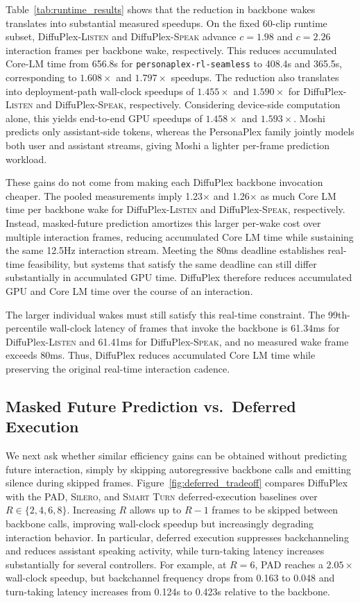 Table~\ref{tab:runtime_results} shows that the reduction in backbone wakes translates into substantial measured speedups.
On the fixed 60-clip runtime subset, DiffuPlex-\textsc{Listen} and DiffuPlex-\textsc{Speak} advance $c=1.98$ and $c=2.26$ interaction frames per backbone wake, respectively.
This reduces accumulated Core-LM time from 656.8s for \texttt{personaplex-rl-seamless} to 408.4s and 365.5s, corresponding to $1.608\times$ and $1.797\times$ speedups.
The reduction also translates into deployment-path wall-clock speedups of $1.455\times$ and $1.590\times$ for DiffuPlex-\textsc{Listen} and DiffuPlex-\textsc{Speak}, respectively.
Considering device-side computation alone, this yields end-to-end GPU speedups of $1.458\times$ and $1.593\times$.
Moshi predicts only assistant-side tokens, whereas the PersonaPlex family jointly models both user and assistant streams, giving Moshi a lighter per-frame prediction workload.

These gains do not come from making each DiffuPlex backbone invocation cheaper.
The pooled measurements imply 1.23$\times$ and 1.26$\times$ as much Core LM time per
backbone wake for DiffuPlex-\textsc{Listen} and DiffuPlex-\textsc{Speak}, respectively.
Instead, masked-future prediction amortizes this larger per-wake cost over multiple interaction
frames, reducing accumulated Core LM time while sustaining the same 12.5Hz interaction stream.
Meeting the 80ms deadline establishes real-time feasibility, but systems that satisfy the same
deadline can still differ substantially in accumulated GPU time.
DiffuPlex therefore reduces accumulated GPU and Core LM time over the course of an interaction.

The larger individual wakes must still satisfy this real-time constraint.
The 99th-percentile wall-clock latency of frames that invoke the backbone is 61.34ms for DiffuPlex-\textsc{Listen} and 61.41ms for DiffuPlex-\textsc{Speak}, and no measured wake frame exceeds 80ms.
Thus, DiffuPlex reduces accumulated Core LM time while preserving the original real-time interaction cadence.

\subsection{Masked Future Prediction vs.\ Deferred Execution}
\label{subsec:deferred_results}

We next ask whether similar efficiency gains can be obtained without predicting future interaction, simply by skipping autoregressive backbone calls and emitting silence during skipped frames.
Figure~\ref{fig:deferred_tradeoff} compares DiffuPlex with the \textsc{PAD}, \textsc{Silero}, and \textsc{Smart Turn} deferred-execution baselines over $R\in\{2,4,6,8\}$.
Increasing $R$ allows up to $R-1$ frames to be skipped between backbone calls, improving wall-clock speedup but increasingly degrading interaction behavior.
In particular, deferred execution suppresses backchanneling and reduces assistant speaking activity, while turn-taking latency increases substantially for several controllers.
For example, at $R=6$, \textsc{PAD} reaches a $2.05\times$ wall-clock speedup, but backchannel frequency drops from 0.163 to 0.048 and turn-taking latency increases from 0.124s to 0.423s relative to the backbone.

